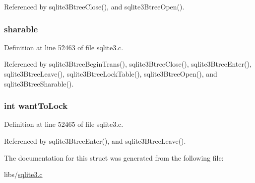 Referenced by sqlite3\+Btree\+Close(), and sqlite3\+Btree\+Open().

\hypertarget{struct_btree_a31049bc7f1be67cb3456bbb3ac791f99}{}
\subsubsection[{sharable}]{ sharable}\label{struct_btree_a31049bc7f1be67cb3456bbb3ac791f99}


Definition at line 52463 of file sqlite3.\+c.



Referenced by sqlite3\+Btree\+Begin\+Trans(), sqlite3\+Btree\+Close(), sqlite3\+Btree\+Enter(), sqlite3\+Btree\+Leave(), sqlite3\+Btree\+Lock\+Table(), sqlite3\+Btree\+Open(), and sqlite3\+Btree\+Sharable().

\hypertarget{struct_btree_a97898981f2186862b2aeaa212556fa07}{}
\subsubsection[{want\+To\+Lock}]{\setlength{\rightskip}{0pt plus 5cm}int want\+To\+Lock}\label{struct_btree_a97898981f2186862b2aeaa212556fa07}


Definition at line 52465 of file sqlite3.\+c.



Referenced by sqlite3\+Btree\+Enter(), and sqlite3\+Btree\+Leave().



The documentation for this struct was generated from the following file\+:\begin{DoxyCompactItemize}
\item 
libs/\hyperlink{sqlite3_8c}{sqlite3.\+c}\end{DoxyCompactItemize}
